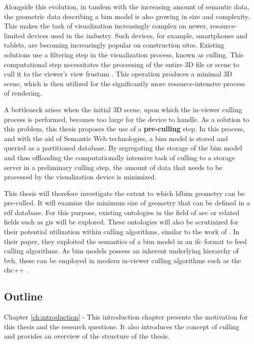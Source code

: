 \begin{refsection}
\begin{multicols}{2}
        Alongside this evolution, in tandem with the increasing amount of semantic data, the geometric data describing a \ac{bim} model is also growing in size and complexity. This makes the task of visualization increasingly complex on newer, resource-limited devices used in the industry. Such devices, for example, smartphones and tablets, are becoming increasingly popular on construction sites. Existing solutions use a filtering step in the visualization process, known as culling. This computational step necessitates the processing of the entire 3D file or scene to cull it to the viewer's view frustum \parencite{Johansson2015}. This operation produces a minimal 3D scene, which is then utilized for the significantly more resource-intensive process of rendering.

        A bottleneck arises when the initial 3D scene, upon which the in-viewer culling process is performed, becomes too large for the device to handle. As a solution to this problem, this thesis proposes the use of a \textbf{pre-culling} step. In this process, and with the aid of Semantic Web technologies, a \ac{bim} model is stored and queried as a partitioned database. By segregating the storage of the \ac{bim} model and thus offloading the computationally intensive task of culling to a storage server in a preliminary culling step, the amount of data that needs to be processed by the visualization device is minimized.

        This thesis will therefore investigate the extent to which \ac{ldbim} geometry can be pre-culled. It will examine the minimum size of geometry that can be defined in a \ac{rdf} database. For this purpose, existing ontologies in the field of \ac{aec} or related fields such as \ac{gis} will be explored. These ontologies will also be scrutinized for their potential utilization within culling algorithms, similar to the work of \cite{Johansson2009}. In their paper, they exploited the semantics of a \ac{bim} model in an \ac{ifc} format to feed culling algorithms. As \ac{bim} models possess an inherent underlying hierarchy of \ac{bvh}, these can be employed in modern in-viewer culling algorithms such as the \ac{chc}++ \parencite{Johansson2015}.

        \subsection*{Outline}
        \textsf{Chapter \ref{ch:introduction} -}
        This introduction chapter presents the motivation for this thesis and the research questions. It also introduces the concept of culling and provides an overview of the structure of the thesis.


\end{multicols}
\end{refsection}
